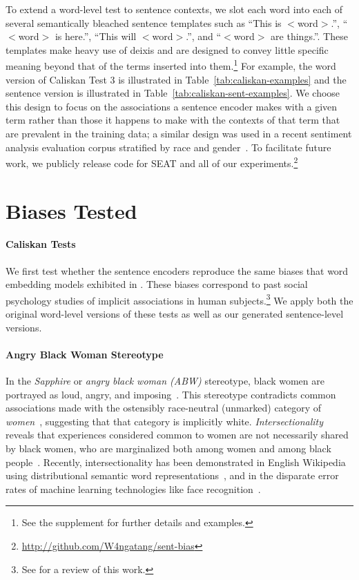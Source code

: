 \documentclass[11pt,a4paper]{article}
\begin{document}
To extend a word-level test to sentence contexts, we slot each word into each of several semantically bleached sentence templates such as ``This is $<$word$>$.'', ``$<$word$>$ is here.'', ``This will $<$word$>$.'', and ``$<$word$>$ are things.''.  These templates make heavy use of deixis and are designed to convey little specific meaning beyond that of the terms inserted into them.\footnote{
    See the supplement for further details and examples.
}
For example, the word version of Caliskan Test 3 is illustrated in Table~\ref{tab:caliskan-examples} and the sentence version is illustrated in Table~\ref{tab:caliskan-sent-examples}.
We choose this design to focus on the associations a sentence encoder makes with a given term rather than those it happens to make with the contexts of that term that are prevalent in the training data; a similar design was used in a recent sentiment analysis evaluation corpus stratified by race and gender~\cite{kiritchenko2018examining}.
To facilitate future work, we publicly release code for SEAT and all of our experiments.\footnote{
    \url{http://github.com/W4ngatang/sent-bias}
}

\section{Biases Tested}

\paragraph{Caliskan Tests}
We first test whether the sentence encoders reproduce the same biases that word embedding models exhibited in \citet{caliskan2017semantics}.
These biases correspond to past social psychology studies of implicit associations in human subjects.\footnote{
    See \citet{greenwald2009understanding} for a review of this work.
}
We apply both the original word-level versions of these tests as well as our generated sentence-level versions.

\paragraph{Angry Black Woman Stereotype}
In the \emph{Sapphire} or \emph{angry black woman (ABW)} stereotype, black women are portrayed as loud, angry, and imposing~\cite{collins2004black,madison2009crazy,harrisperry2011sister,hooks2015aint,gillespie2016race}.
This stereotype contradicts common associations made with the ostensibly race-neutral (unmarked) category of \textit{women}~\cite{bem1974measurement}, suggesting that that category is implicitly white.  \emph{Intersectionality} reveals that experiences considered common to women are not necessarily shared by black women, who are marginalized both among women and among black people~\cite{crenshaw1989demarginalizing}.
Recently, intersectionality has been demonstrated in English Wikipedia using distributional semantic word representations~\cite{herbelot2012distributional}, and in the disparate error rates of machine learning technologies like face recognition~\cite{buolamwini2018gender}.
\end{document}
